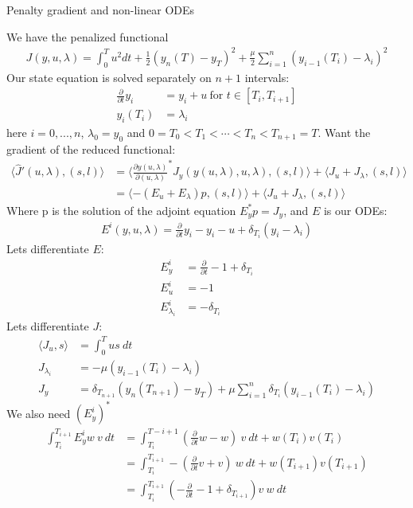 \documentclass[11pt,a4paper]{report}
\begin{document}
\begin{center}

\LARGE Penalty gradient and non-linear ODEs 


\end{center}
We have the penalized functional
\begin{align*}
J(y,u,\lambda) = \int_0^T u^2 dt + \frac{1}{2}(y_n(T)-y_T)^2 + \frac{\mu}{2} \sum_{i=1}^n (y_{i-1}(T_i)-\lambda_i)^2 
\end{align*}
Our state equation is solved separately on $n+1$ intervals:
\begin{align*}
\frac{\partial }{\partial t} y_i &= y_i + u \ \text{for $t \in [T_{i},T_{i+1}]$}\\
y_i(T_i) &= \lambda_i
\end{align*}
here $i=0,...,n$, $\lambda_0=y_0$ and $0=T_0<T_1<\cdots<T_n<T_{n+1}=T$. Want the gradient of the reduced functional:
\begin{align*}
\langle \hat{J}'(u,\lambda), (s,l)\rangle &= \langle \frac{\partial y(u,\lambda)}{\partial(u,\lambda)}^* J_y(y(u,\lambda),u,\lambda), (s,l)\rangle + \langle J_u+J_{\lambda}, (s,l)\rangle \\
&=\langle -(E_u+E_{\lambda})p , (s,l)\rangle + \langle J_u+J_{\lambda}, (s,l)\rangle
\end{align*} 
Where p is the solution of the adjoint equation $E_y^*p=J_y$, and $E$ is our ODEs:
\begin{align*}
E^i(y,u,\lambda)= \frac{\partial }{\partial t} y_i - y_i -u+ \delta_{T_i}(y_i-\lambda_i)
\end{align*} 
Lets differentiate $E$:
\begin{align*}
E_y^i &= \frac{\partial }{\partial t} - 1 + \delta_{T_i} \\
E_u^i &= -1 \\
E_{\lambda_i}^i &= -\delta_{T_i}
\end{align*}
Lets differentiate $J$:
\begin{align*}
\langle J_u,s\rangle &= \int_0^T us \ dt \\
J_{\lambda_i}&= -\mu(y_{i-1}(T_i)-\lambda_i) \\
J_y &= \delta_{T_{n+1}}(y_n(T_{n+1})-y_T) + \mu \sum_{i=1}^n \delta_{T_{i}}(y_{i-1}(T_i)-\lambda_i ) 
\end{align*}
We also need $(E_y^i)^*$
\begin{align*}
\int_{T_i}^{T_{i+1}} E_y^iw \ v \ dt & = \int_{T_i}^{T-{i+1}} (\frac{\partial }{\partial t}w -w) \ v \ dt + w(T_i)v(T_i) \\
&= \int_{T_i}^{T_{i+1}}-(\frac{\partial }{\partial t}v+v) \ w \ dt + w(T_{i+1})v(T_{i+1}) \\
&= \int_{T_i}^{T_{i+1}} (-\frac{\partial }{\partial t}-1 + \delta_{T_{i+1}})v \ w \ dt
\end{align*} 
\end{document}
